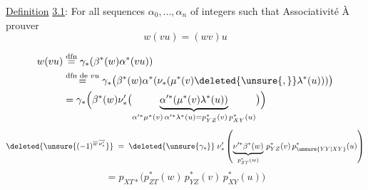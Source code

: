 \uline{Definition} \uline{3.1}: For all sequences $\alpha_0,\ldots,\alpha_n$ of integers such that
Associativité
À prouver
\[
w(vu)=(wv)u
\]

\[
\begin{aligned}
w(vu)&\overset{\text{dfn}}=\gamma_*(\beta^*(w)\alpha^*(vu))\\
&\overset{\text{dfn de }vu}=\gamma_*\bigl(\beta^*(w)\alpha^*(\nu_*(\mu^*(v)\deleted{\unsure{,}}\lambda^*(u)))\bigr)\\
&=\gamma_*\Bigl(\beta^*(w)\nu'_*\bigl(\underbrace{\alpha'^*(\mu^*(v)\lambda^*(u))}_{\alpha'^*\mu^*(v)\,\alpha'^*\lambda^*(u)=p_{YZ}^*(v)\,p_{XY}^*(u)}\bigr)\Bigr)
\end{aligned}
\]
\[
\deleted{\unsure{(-1)^{\overline w\,\overline{\nu'_*}}}}\;=\;\deleted{\unsure{\gamma_*}}\;
\nu'_*\left(\underbrace{\nu'^*\beta^*(w)}_{p_{ZT}^*(w)}\,p_{YZ}^*(v)\,p_{\unsure{YY|XY}}^*(u)\right)
\]
\[
=p_{XT*}\bigl(p_{ZT}^*(w)\,p_{YZ}^*(v)\,p_{XY}^*(u)\bigr)
\]

